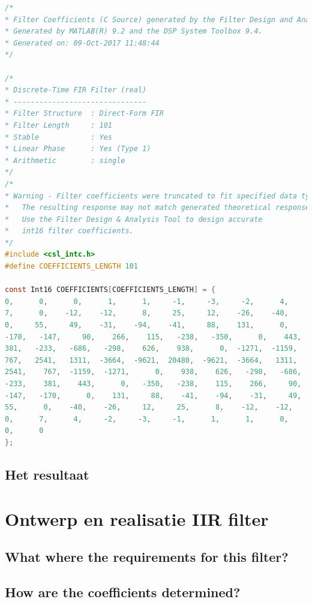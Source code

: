 \documentclass[11pt,a4paper]{article}
\begin{document}
	\begin{lstlisting}[language=c]
/*
* Filter Coefficients (C Source) generated by the Filter Design and Analysis Tool
* Generated by MATLAB(R) 9.2 and the DSP System Toolbox 9.4.
* Generated on: 09-Oct-2017 11:48:44
*/

/*
* Discrete-Time FIR Filter (real)
* -------------------------------
* Filter Structure  : Direct-Form FIR
* Filter Length     : 101
* Stable            : Yes
* Linear Phase      : Yes (Type 1)
* Arithmetic        : single
*/
/*
* Warning - Filter coefficients were truncated to fit specified data type.  
*   The resulting response may not match generated theoretical response.
*   Use the Filter Design & Analysis Tool to design accurate
*   int16 filter coefficients.
*/
#include <csl_intc.h>
#define COEFFICIENTS_LENGTH 101

const Int16 COEFFICIENTS[COEFFICIENTS_LENGTH] = {
0,      0,      0,      1,      1,     -1,     -3,     -2,      4,
7,      0,    -12,    -12,      8,     25,     12,    -26,    -40,
0,     55,     49,    -31,    -94,    -41,     88,    131,      0,
-170,   -147,     90,    266,    115,   -238,   -350,      0,    443,
381,   -233,   -686,   -298,    626,    938,      0,  -1271,  -1159,
767,   2541,   1311,  -3664,  -9621,  20480,  -9621,  -3664,   1311,
2541,    767,  -1159,  -1271,      0,    938,    626,   -298,   -686,
-233,    381,    443,      0,   -350,   -238,    115,    266,     90,
-147,   -170,      0,    131,     88,    -41,    -94,    -31,     49,
55,      0,    -40,    -26,     12,     25,      8,    -12,    -12,
0,      7,      4,     -2,     -3,     -1,      1,      1,      0,
0,      0
};	
	\end{lstlisting}
	\clearpage


	\subsection{Het resultaat}
	\clearpage
	
	\section{Ontwerp en realisatie IIR filter}
	\subsection{What where the requirements for this filter?}
	
	\subsection{How are the coefficients determined?}
	
\end{document}
